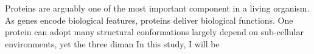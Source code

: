 Proteins are arguably one of the most important component in a living organism. As genes encode biological features, proteins deliver biological functions. One protein can adopt many structural conformations largely depend on sub-cellular environments, yet the three diman     In this study, I will be 